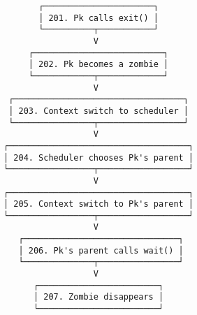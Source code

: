 \documentclass[varwidth,crop]{standalone}
\begin{document}
\begin{verbatim}
       ┌──────────────────────┐
       │ 201. Pk calls exit() │
       └──────────┬───────────┘
                  V
     ┌──────────────────────────┐
     │ 202. Pk becomes a zombie │
     └────────────┬─────────────┘
                  V
 ┌──────────────────────────────────┐
 │ 203. Context switch to scheduler │
 └────────────────┬─────────────────┘
                  V
┌────────────────────────────────────┐
│ 204. Scheduler chooses Pk's parent │
└─────────────────┬──────────────────┘
                  V
┌────────────────────────────────────┐
│ 205. Context switch to Pk's parent │
└─────────────────┬──────────────────┘
                  V
   ┌───────────────────────────────┐
   │ 206. Pk's parent calls wait() │
   └──────────────┬────────────────┘
                  V
      ┌────────────────────────┐
      │ 207. Zombie disappears │
      └────────────────────────┘
\end{verbatim}
\end{document}
